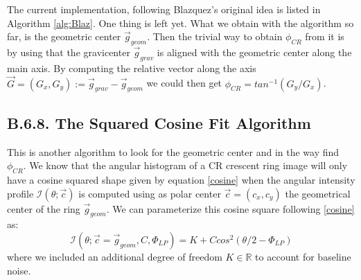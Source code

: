 \documentclass[11pt, a4paper, twoside]{article} %
\newcommand{\R}{\mathbb{R}} %
\begin{document}
The current implementation, following Blazquez's original idea is listed in Algorithm \ref{alg:Blaz}. One thing is left yet. What we obtain with the algorithm so far, is the geometric center $\vec{g}_{geom}$. Then the trivial way to obtain $\phi_{CR}$ from it is by using that the gravicenter $\vec{g}_{grav}$ is aligned with the geometric center along the main axis. By computing the relative vector along the axis $\vec{G}=(G_x,G_y):=\vec{g}_{grav}-\vec{g}_{geom}$ we could then get $\phi_{CR}=tan^{-1}(G_y/G_x)$.



\subsection*{B.6.8. The Squared Cosine Fit Algorithm}
This is another algorithm to look for the geometric center and in the way find $\phi_{CR}$. We know that the angular histogram of a CR crescent ring image will only have a cosine squared shape given by equation \eqref{cosine} when the angular intensity profile $\mathcal{I}(\theta;\vec{c})$ is computed using as polar center $\vec{c}=(c_x,c_y)$ the geometrical center of the ring $\vec{g}_{geom}$. We can parameterize this cosine square following \eqref{cosine} as:
\begin{equation}
\mathcal{I}(\theta;\vec{c}=\vec{g}_{geom}, C,\Phi_{LP})=K+Ccos^2(\theta/2-\Phi_{LP})
\end{equation}
where we included an additional degree of freedom $K\in\R$ to account for baseline noise.
\end{document}
